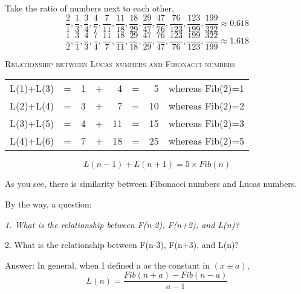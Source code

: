 \documentclass{jreport}
\begin{document}
Take the ratio of numbers next to each other,
\[\frac{2}{1},\frac{1}{3},\frac{3}{4},\frac{4}{7},\frac{7}{11},\frac{11}{18},\frac{18}{29},\frac{29}{47},\frac{47}{76},\frac{76}{123},\frac{123}{199},\frac{199}{322}\approx0.618\]
\[\frac{1}{2},\frac{3}{1},\frac{4}{3},\frac{7}{4},\frac{11}{7},\frac{18}{11},\frac{29}{18},\frac{47}{29},\frac{76}{47},\frac{123}{76},\frac{199}{123},\frac{322}{199}\approx1.618\]

\textsc{Relationship between Lucas numbers and Fibonacci numbers}
\begin{table}[htbp]
\begin{center}
\begin{tabular}{|ccrcrcr|c|}
\hline
L(1)+L(3) & = & 1 & + & 4 & = & 5 & whereas Fib(2)=1\\
L(2)+L(4) & = & 3 & + & 7 & = & 10 & whereas Fib(2)=2\\
L(3)+L(5) & = & 4 & + & 11 & = & 15 & whereas Fib(2)=3\\
L(4)+L(6) & = & 7 & + & 18 & = & 25 & whereas Fib(2)=5\\
\hline
\end{tabular}
\end{center}
\end{table}
\[L(n-1)+L(n+1)=5\times Fib(n)\]

As you see, there is similarity between Fibonacci numbers and Lucas numbers.

By the way, a question:
\begin{center}
\begin{minipage}{10cm}
\itshape 
1. What is the relationship between F(n-2), F(n+2), and L(n)?

2. What is the relationship between F(n-3), F(n+3), and L(n)?
\end{minipage}
\end{center}
Answer: In general, when I defined a as the constant in $(x\pm a)$,
\[L(n)=\frac{Fib(n+a)-Fib(n-a)}{a-1}\]
\end{document}
